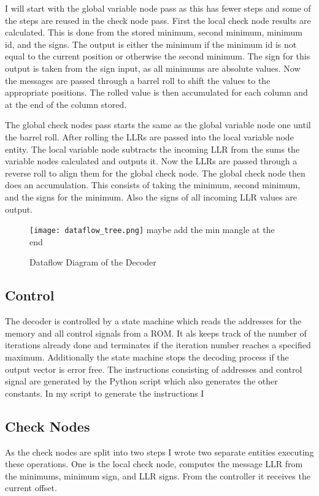 I will start with the global variable node pass as this has fewer steps and some of the steps are reused in the check node pass. First the local check node results are calculated. This is done from the stored minimum, second minimum, minimum id, and the signs. The output is either the minimum if the minimum id is not equal to the current position or otherwise the second minimum. The sign for this output is taken from the sign input, as all minimums are absolute values. Now the messages are passed through a barrel roll to shift the values to the appropriate positions. The rolled value is then accumulated for each column and at the end of the column stored. 

The global check nodes pass starts the same as the global variable node one until the barrel roll. After rolling the LLRs are passed into the local variable node entity. The local variable node subtracts the incoming LLR from the sums the variable nodes calculated and outputs it. Now the LLRs are passed through a reverse roll to align them for the global check node. The global check node then does an accumulation. This consists of taking the minimum, second minimum, and the signs for the minimum. Also the signs of all incoming LLR values are output.

\begin{figure}
    \texttt{[image: dataflow\_tree.png]}
    maybe add the min mangle at the end
    \centering
    \caption{Dataflow Diagram of the Decoder}
    \label{datafl_tree}
\end{figure}

\subsection{Control}
The decoder is controlled by a state machine which reads the addresses for the memory and all control signals from a ROM. It als keeps track of the number of iterations already done and terminates if the iteration number reaches a specified maximum. Additionally the state machine stops the decoding process if the output vector is error free. The instructions consisting of addresses and control signal are generated by the Python script which also generates the other constants. In my script to generate the instructions I 

\subsection{Check Nodes}
As the check nodes are split into two steps I wrote two separate entities executing these operations. One is the local check node, computes the message LLR from the minimums, minimum sign, and LLR signs. From the controller it receives the current offset. 


